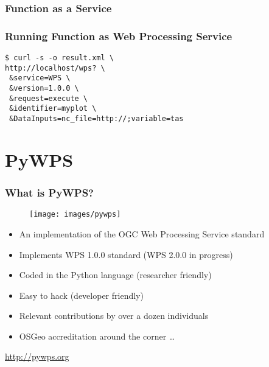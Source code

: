 \documentclass{beamer}
\begin{document}
\begin{frame}[fragile]
  \frametitle<presentation>{Function as a Service}
    \lstset{language=python} 
\end{frame}

\begin{frame}[fragile]
  \frametitle<presentation>{Running Function as Web Processing Service}
    \begin{verbatim}
$ curl -s -o result.xml \
http://localhost/wps? \
 &service=WPS \
 &version=1.0.0 \
 &request=execute \
 &identifier=myplot \
 &DataInputs=nc_file=http://;variable=tas
    \end{verbatim}
\end{frame}

\section{PyWPS}

\begin{frame}
\frametitle<presentation>{What is PyWPS?}

\begin{figure}[ht]
  \centering
  \texttt{[image: images/pywps]}
\end{figure}

\begin{itemize}
  \item An implementation of the OGC Web Processing Service standard
  \item Implements WPS 1.0.0 standard (WPS 2.0.0 in progress)
  \item Coded in the Python language (researcher friendly)
  \item Easy to hack (developer friendly)
  \item Relevant contributions by over a dozen individuals
  \item OSGeo accreditation around the corner \ldots
\end{itemize}

\vspace{0.2cm}
\centering
\footnotesize{\url{http://pywps.org}}

\end{frame}
\end{document}
